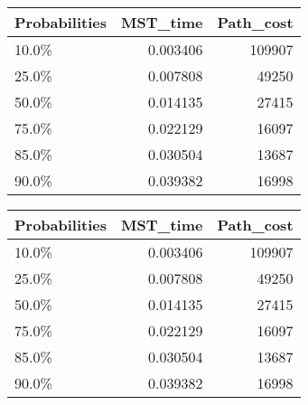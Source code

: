 \begin{tabular}{lrr}
\toprule
Probabilities &  MST\_time &  Path\_cost \\
\midrule
        10.0\% &  0.003406 &     109907 \\
        25.0\% &  0.007808 &      49250 \\
        50.0\% &  0.014135 &      27415 \\
        75.0\% &  0.022129 &      16097 \\
        85.0\% &  0.030504 &      13687 \\
        90.0\% &  0.039382 &      16998 \\
\bottomrule
\end{tabular}
\begin{tabular}{|l|r|r|}
\toprule \hline
Probabilities &  MST\_time &  Path\_cost \\ \hline

\midrule
        10.0\% &  0.003406 &     109907 \\ \hline

        25.0\% &  0.007808 &      49250 \\ \hline

        50.0\% &  0.014135 &      27415 \\ \hline

        75.0\% &  0.022129 &      16097 \\ \hline

        85.0\% &  0.030504 &      13687 \\ \hline

        90.0\% &  0.039382 &      16998 \\ \hline

\bottomrule
\end{tabular}
